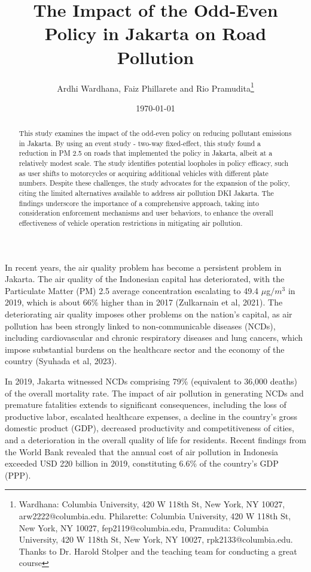 \documentclass[AEJ]{AEA}
\begin{document}
\title{The Impact of the Odd-Even Policy in Jakarta on Road Pollution}
\shortTitle{}
\author{Ardhi Wardhana, Faiz Phillarete and Rio Pramudita\thanks{%
Wardhana: Columbia University, 420 W 118th St, New York, NY 10027, arw2222@columbia.edu. Philarette: Columbia University, 420 W 118th St, New York, NY 10027, fep2119@columbia.edu, Pramudita: Columbia University, 420 W 118th St, New York, NY 10027, rpk2133@columbia.edu. Thanks to Dr. Harold Stolper and the teaching team for conducting a great course}}
\date{\today}
\pubMonth{}
\pubYear{}
\pubVolume{}
\pubIssue{}
\JEL{}
\Keywords{}

\begin{abstract}
This study examines the impact of the odd-even policy on reducing pollutant emissions in Jakarta. By using an event study - two-way fixed-effect, this study found a reduction in PM 2.5 on roads that implemented the policy in Jakarta, albeit at a relatively modest scale. The study identifies potential loopholes in policy efficacy, such as user shifts to motorcycles or acquiring additional vehicles with different plate numbers. Despite these challenges, the study advocates for the expansion of the policy, citing the limited alternatives available to address air pollution DKI Jakarta. The findings underscore the importance of a comprehensive approach, taking into consideration enforcement mechanisms and user behaviors, to enhance the overall effectiveness of vehicle operation restrictions in mitigating air pollution.
\end{abstract}

\maketitle

In recent years, the air quality problem has become a persistent problem in Jakarta. The air quality of the Indonesian capital has deteriorated, with the Particulate Matter (PM) 2.5 average concentration escalating to 49.4 $\mu$g$/m^3$ in 2019, which is about 66\% higher than in 2017 (Zulkarnain et al, 2021). The deteriorating air quality imposes other problems on the nation's capital, as air pollution has been strongly linked to non-communicable diseases (NCDs), including cardiovascular and chronic respiratory diseases and lung cancers, which impose substantial burdens on the healthcare sector and the economy of the country (Syuhada et al, 2023). 

In 2019, Jakarta witnessed NCDs comprising 79\% (equivalent to 36,000 deaths) of the overall mortality rate. The impact of air pollution in generating NCDs and premature fatalities extends to significant consequences, including the loss of productive labor, escalated healthcare expenses, a decline in the country's gross domestic product (GDP), decreased productivity and competitiveness of cities, and a deterioration in the overall quality of life for residents. Recent findings from the World Bank revealed that the annual cost of air pollution in Indonesia exceeded USD 220 billion in 2019, constituting 6.6\% of the country's GDP (PPP).
\end{document}
